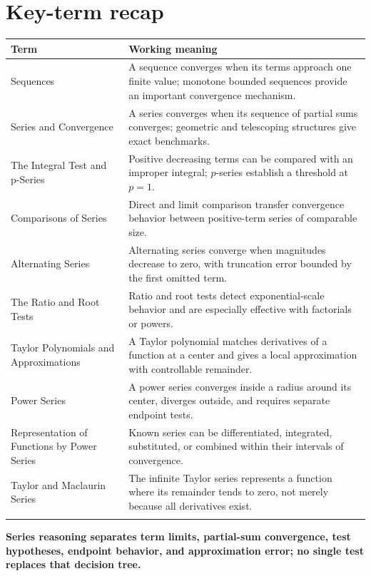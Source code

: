 \documentclass[11pt]{article}
\begin{document}
\normalsize

\section{Key-term recap}
\small
\begin{longtable}{@{}>{\RaggedRight\arraybackslash}p{}>{\RaggedRight\arraybackslash}p{}@{}}
\toprule
\textbf{Term} & \textbf{Working meaning}\\
\midrule\endhead
Sequences & A sequence converges when its terms approach one finite value; monotone bounded sequences provide an important convergence mechanism. \\\addlinespace[2pt]
Series and Convergence & A series converges when its sequence of partial sums converges; geometric and telescoping structures give exact benchmarks. \\\addlinespace[2pt]
The Integral Test and p-Series & Positive decreasing terms can be compared with an improper integral; $p$-series establish a threshold at $p=1$. \\\addlinespace[2pt]
Comparisons of Series & Direct and limit comparison transfer convergence behavior between positive-term series of comparable size. \\\addlinespace[2pt]
Alternating Series & Alternating series converge when magnitudes decrease to zero, with truncation error bounded by the first omitted term. \\\addlinespace[2pt]
The Ratio and Root Tests & Ratio and root tests detect exponential-scale behavior and are especially effective with factorials or powers. \\\addlinespace[2pt]
Taylor Polynomials and Approximations & A Taylor polynomial matches derivatives of a function at a center and gives a local approximation with controllable remainder. \\\addlinespace[2pt]
Power Series & A power series converges inside a radius around its center, diverges outside, and requires separate endpoint tests. \\\addlinespace[2pt]
Representation of Functions by Power Series & Known series can be differentiated, integrated, substituted, or combined within their intervals of convergence. \\\addlinespace[2pt]
Taylor and Maclaurin Series & The infinite Taylor series represents a function where its remainder tends to zero, not merely because all derivatives exist. \\\addlinespace[2pt]
\bottomrule
\end{longtable}
\normalsize

\enlargethispage{4\baselineskip}
\begin{tcolorbox}[title=One-sentence takeaway,fonttitle=\bfseries,colback=Ink,colframe=Ink,coltext=white,coltitle=white,arc=2mm,boxrule=0pt]
\centering\bfseries Series reasoning separates term limits, partial-sum convergence, test hypotheses, endpoint behavior, and approximation error; no single test replaces that decision tree.
\end{tcolorbox}
\end{document}

